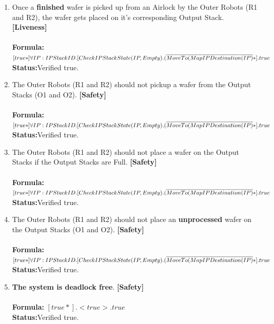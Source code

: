 \documentclass[a4paper,12pt]{article}
\begin{document}
\begin{enumerate}
\item Once a \textbf{finished} wafer is picked up from an Airlock by the Outer Robots (R1 and R2), the wafer gets placed on it's corresponding Output Stack. \textbf{[Liveness]}
\\
\\\textbf{Formula:} $[true*] \forall IP: IPStackID.[CheckIPStackState(IP, Empty).
\\(\overline{MoveTo(MapIPDestination(IP)}*].true$ \\\textbf{Status:}Verified true.

\item The Outer Robots (R1 and R2) should not pickup a wafer from the Output Stacks (O1 and O2). \textbf{[Safety]}
\\
\\\textbf{Formula:} $[true*] \forall IP: IPStackID.[CheckIPStackState(IP, Empty).
\\(\overline{MoveTo(MapIPDestination(IP)}*].true$ \\\textbf{Status:}Verified true.

\item The Outer Robots (R1 and R2) should not place a wafer on the Output Stacks if the Output Stacks are Full. \textbf{[Safety]}
\\
\\\textbf{Formula:} $[true*] \forall IP: IPStackID.[CheckIPStackState(IP, Empty).
\\(\overline{MoveTo(MapIPDestination(IP)}*].true$ \\\textbf{Status:}Verified true.

\item The Outer Robots (R1 and R2) should not place an \textbf{unprocessed} wafer on the Output Stacks (O1 and O2). \textbf{[Safety]}
\\
\\\textbf{Formula:} $[true*] \forall IP: IPStackID.[CheckIPStackState(IP, Empty).
\\(\overline{MoveTo(MapIPDestination(IP)}*].true$ \\\textbf{Status:}Verified true.

\item \textbf{The system is deadlock free}. \textbf{[Safety]}
\\
\\\textbf{Formula:} $[true*].<true>.true$
\\\textbf{Status:}Verified true.
\end{enumerate}
\end{document}
